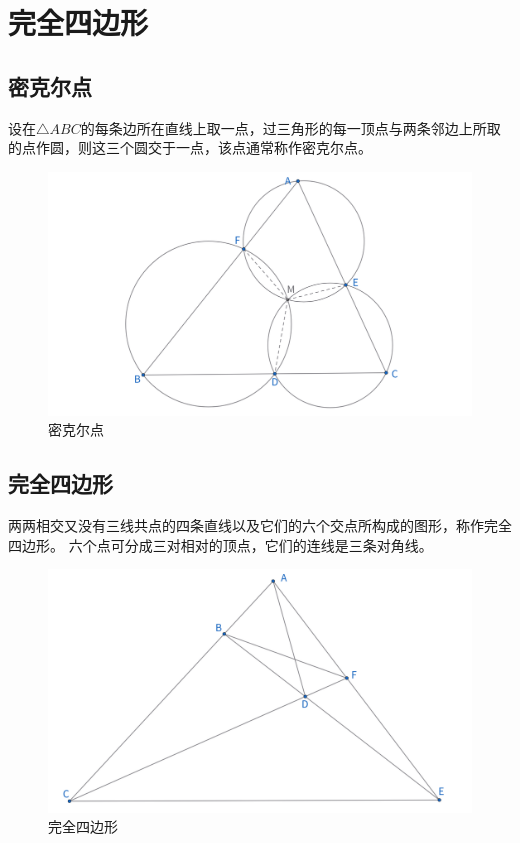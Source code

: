 \section{完全四边形}
\subsection{密克尔点}
\begin{definition}
    设在$\triangle ABC$的每条边所在直线上取一点，过三角形的每一顶点与两条邻边上所取的点作圆，则这三个圆交于一点，该点通常称作密克尔点。
\end{definition}
\begin{figure}[htbp]
    \centering
    \includegraphics[width=\linewidth]{figures/密克尔点.png}
    \caption{密克尔点}
\end{figure}


\newpage 
\subsection{完全四边形}
\begin{definition}
    两两相交又没有三线共点的四条直线以及它们的六个交点所构成的图形，称作完全四边形。
    六个点可分成三对相对的顶点，它们的连线是三条对角线。
\end{definition}
\begin{figure}
    \centering
    \includegraphics[width=0.5\linewidth]{figures/完全四边形.png}
    \caption{完全四边形}
\end{figure}

